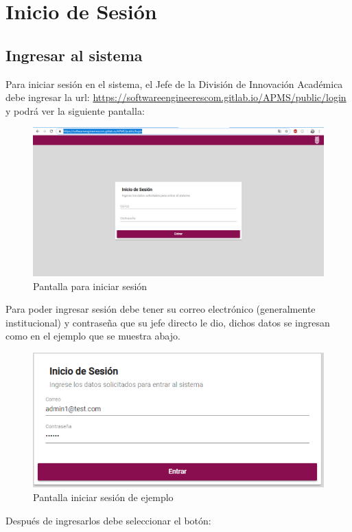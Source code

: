 \section{Inicio de Sesión}

    \subsection{Ingresar al sistema}
        Para iniciar sesión en el sistema, el Jefe de la División de Innovación Académica debe ingresar la url: \url{https://softwareengineerescom.gitlab.io/APMS/public/login} y podrá ver la siguiente pantalla:

        \begin{figure}[H]
            \centering
            \hypertarget{iniciarS}{\includegraphics[width=0.7\linewidth]{images/SP5/IniciarSesion}}
            \caption{Pantalla para iniciar sesión}
        \end{figure}
        \clearpage
        Para poder ingresar sesión debe tener su correo electrónico (generalmente institucional) y contraseña que su jefe directo le dio, dichos datos se ingresan como en el ejemplo que se muestra abajo.

        \begin{figure}[H]
            \centering
            \hypertarget{iniciarL}{\includegraphics[width=0.5\linewidth]{images/SP5/ejemploIniciar}}
            \caption{Pantalla iniciar sesión de ejemplo}
        \end{figure}

        Después de ingresarlos debe seleccionar el botón:

